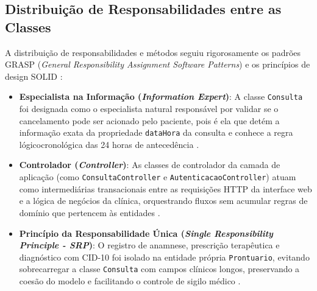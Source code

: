 \subsection{Distribuição de Responsabilidades entre as Classes}

A distribuição de responsabilidades e métodos seguiu rigorosamente os padrões GRASP (\textit{General Responsibility Assignment Software Patterns}) e os princípios de design SOLID \cite{larman2004, martin2019}:
\begin{itemize}
    \item \textbf{Especialista na Informação (\textit{Information Expert})}: A classe \texttt{Consulta} foi designada como o especialista natural responsável por validar se o cancelamento pode ser acionado pelo paciente, pois é ela que detém a informação exata da propriedade \texttt{dataHora} da consulta e conhece a regra lógicocronológica das 24 horas de antecedência \cite{larman2004}.
    \item \textbf{Controlador (\textit{Controller})}: As classes de controlador da camada de aplicação (como \texttt{ConsultaController} e \texttt{AutenticacaoController}) atuam como intermediárias transacionais entre as requisições HTTP da interface web e a lógica de negócios da clínica, orquestrando fluxos sem acumular regras de domínio que pertencem às entidades \cite{fowler2002}.
    \item \textbf{Princípio da Responsabilidade Única (\textit{Single Responsibility Principle - SRP})}: O registro de anamnese, prescrição terapêutica e diagnóstico com CID-10 foi isolado na entidade própria \texttt{Prontuario}, evitando sobrecarregar a classe \texttt{Consulta} com campos clínicos longos, preservando a coesão do modelo e facilitando o controle de sigilo médico \cite{martin2019}.
\end{itemize}

